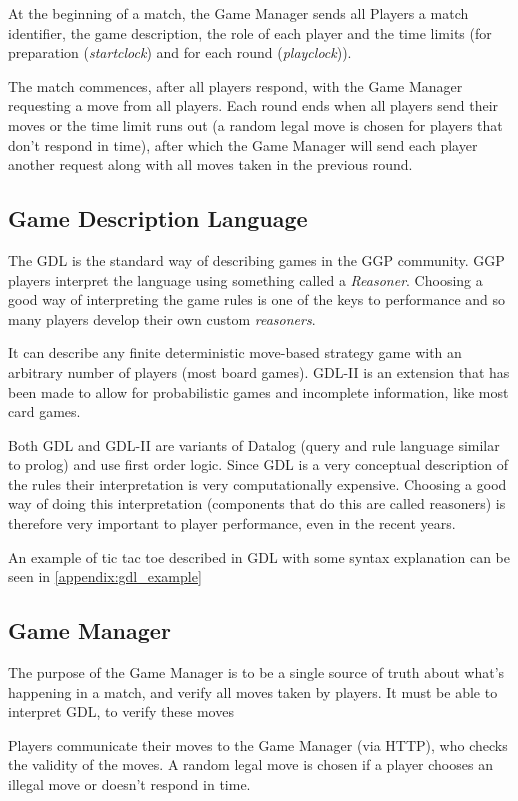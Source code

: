 At the beginning of a match, the Game Manager sends all Players a match identifier, the game description, the role of each player and the time limits (for preparation (\textit{startclock}) and for each round (\textit{playclock})).

The match commences, after all players respond, with the Game Manager requesting a move from all players. Each round ends when all players send their moves or the time limit runs out (a random legal move is chosen for players that don't respond in time), after which the Game Manager will send each player another request along with all moves taken in the previous round.


\subsection{Game Description Language}
The \gls{GDL} is the standard way of describing games in the \gls{GGP} community.
\gls{GGP} players interpret the language using something called a \textit{Reasoner}. Choosing a good way of interpreting the game rules is one of the keys to performance and so many players develop their own custom \textit{reasoners}.

It can describe any finite deterministic move-based strategy game with an arbitrary number of players (most board games). GDL-II is an extension that has been made to allow for probabilistic games and incomplete information, like most card games.

Both GDL and GDL-II are variants of Datalog (query and rule language similar to prolog) and use first order logic.
Since GDL is a very conceptual description of the rules their interpretation is very computationally expensive. Choosing a good way of doing this interpretation (components that do this are called reasoners) is therefore very important to player performance, even in the recent years.

An example of tic tac toe described in GDL with some syntax explanation can be seen in \ref{appendix:gdl_example}

\subsection{Game Manager}
The purpose of the Game Manager is to be a single source of truth about what's happening in a match, and verify all moves taken by players. It must be able to interpret \gls{GDL}, to verify these moves

Players communicate their moves to the Game Manager (via HTTP), who checks the validity of the moves. A random legal move is chosen if a player chooses an illegal move or doesn't respond in time.

